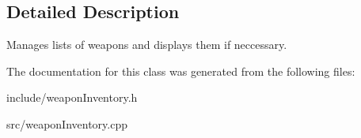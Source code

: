 \subsection{\-Detailed \-Description}
\-Manages lists of weapons and displays them if neccessary. 

\-The documentation for this class was generated from the following files\-:\begin{DoxyCompactItemize}
\item 
include/weapon\-Inventory.\-h\item 
src/weapon\-Inventory.\-cpp\end{DoxyCompactItemize}
